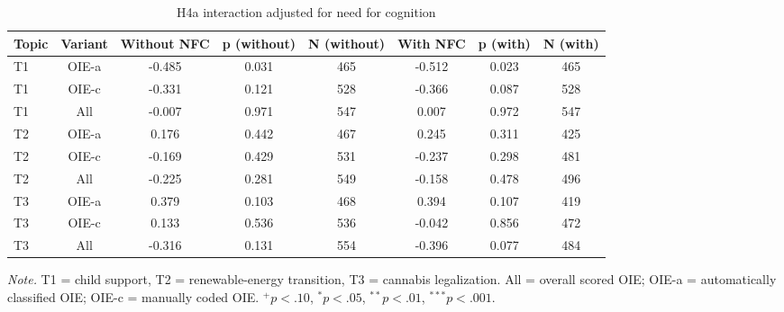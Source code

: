 \begin{table}[htbp]
\centering
\begin{threeparttable}
\caption{H4a interaction adjusted for need for cognition}
\label{tab:tab_sens_nfc}
\begin{tabular}{lccccccc}
\toprule
  Topic & Variant & Without NFC & p (without) & N (without) & With NFC & p (with) & N (with) \\
\midrule
  T1 & OIE-a & -0.485 & 0.031 & 465 & -0.512 & 0.023 & 465 \\
  T1 & OIE-c & -0.331 & 0.121 & 528 & -0.366 & 0.087 & 528 \\
  T1 & All & -0.007 & 0.971 & 547 & 0.007 & 0.972 & 547 \\
  T2 & OIE-a & 0.176 & 0.442 & 467 & 0.245 & 0.311 & 425 \\
  T2 & OIE-c & -0.169 & 0.429 & 531 & -0.237 & 0.298 & 481 \\
  T2 & All & -0.225 & 0.281 & 549 & -0.158 & 0.478 & 496 \\
  T3 & OIE-a & 0.379 & 0.103 & 468 & 0.394 & 0.107 & 419 \\
  T3 & OIE-c & 0.133 & 0.536 & 536 & -0.042 & 0.856 & 472 \\
  T3 & All & -0.316 & 0.131 & 554 & -0.396 & 0.077 & 484 \\
\bottomrule
\end{tabular}
\begin{tablenotes}\footnotesize\item \textit{Note.} T1 = child support, T2 = renewable-energy transition, T3 = cannabis legalization. All = overall scored OIE; OIE-a = automatically classified OIE; OIE-c = manually coded OIE. $^{+}p<.10$, $^{*}p<.05$, $^{**}p<.01$, $^{***}p<.001$.\end{tablenotes}
\end{threeparttable}
\end{table}

